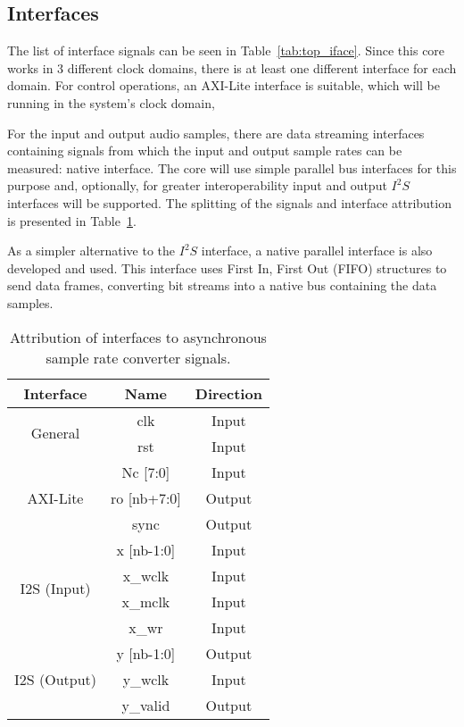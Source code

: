 \subsection{Interfaces}
\label{section:interf}

The list of interface signals can be seen in Table~\ref{tab:top_iface}. Since
this core works in 3 different clock domains, there is at least one different
interface for each domain. For control operations, an AXI-Lite interface is
suitable, which will be running in the system's clock domain,

For the input and output audio samples, there are data streaming interfaces
containing signals from which the input and output sample rates can be measured:
native interface. The core will use simple parallel bus interfaces for this
purpose and, optionally, for greater interoperability input and output $I^2S$
interfaces will be supported. The splitting of the signals and interface
attribution is presented in Table~\ref{tab:ifaces}.

As a simpler alternative to the $I^2S$ interface, a native parallel interface
is also developed and used. This interface uses First In, First Out (FIFO)
structures to send data frames, converting bit streams into a native bus
containing the data samples.

\begin{table}[!htbp]
  \centering
  \caption{Attribution of interfaces to asynchronous sample rate converter signals.}
  \label{tab:ifaces}
  \begin{tabular}{|c|c|c|}
    \hline 
	{\bf Interface} & {\bf Name} & {\bf Direction} \\ \hline
        \hline
	 \multirow{2}{*}{General} & clk & Input\\ \cline{2-3}
	 & rst & Input\\ \cline{2-3}
        \hline \hline
        \multirow{3}{*}{AXI-Lite} & Nc [7:0] & Input\\ \cline{2-3}
        & ro [nb+7:0] & Output\\ \cline{2-3}
        & sync & Output\\ \cline{2-3}
        \hline \hline
        \multirow{4}{*}{I2S (Input)} & x [nb-1:0] & Input\\ \cline{2-3}
        & x\_wclk & Input\\ \cline{2-3}
        & x\_mclk & Input\\ \cline{2-3}
        & x\_wr & Input\\ \cline{2-3}
        \hline \hline
        \multirow{3}{*}{I2S (Output)} & y [nb-1:0] & Output\\ \cline{2-3}
        & y\_wclk & Input\\ \cline{2-3}
        & y\_valid & Output\\ \cline{2-3}
        \hline
  \end{tabular}
\end{table}

